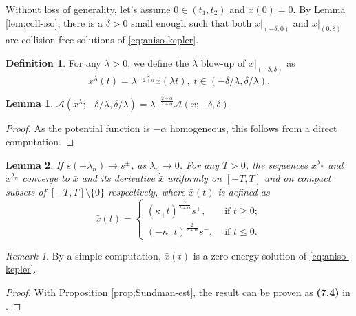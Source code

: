 \documentclass[11pt]{amsart}
\newcommand{\A}{\mathcal A}
\newcommand{\al}{\alpha}
\newcommand{\dl}{\delta}
\newcommand{\lmd}{\lambda}
\newcommand{\kp}{\kappa}
\theoremstyle{plain}
\newtheorem{lem}{Lemma}[section]
\theoremstyle{definition}
\newtheorem{dfn}{Definition}[section]
\theoremstyle{remark}
\newtheorem{rem}{Remark}[section]
\begin{document}
Without loss of generality, let's assume $0 \in (t_1, t_2)$ and $x(0)=0$. By Lemma \ref{lem;coll-iso}, there is a $\dl>0$ small enough such that both $x|_{(-\dl, 0)}$ and $x|_{(0, \dl)}$ are collision-free solutions of \eqref{eq;aniso-kepler}.  

 
\begin{dfn}
\label{dfn;blow-up} For any $\lmd>0$, we define the $\lmd$ blow-up of $x|_{(-\dl, \dl)}$ as 
$$ x^{\lmd}(t) = \lmd^{-\frac{2}{2+\al}} x(\lmd t), \; t \in (-\dl/\lmd, \dl/\lmd). $$
\end{dfn}


\begin{lem}
\label{lem;action-homo} $\A(x^{\lmd}; -\dl/\lmd, \dl/\lmd) = \lmd^{-\frac{2-\al}{2+\al}} \A(x; -\dl, \dl)$. 
\end{lem}

\begin{proof}
	As the potential function is $-\al$ homogeneous, this follows from a direct computation.
\end{proof}

\begin{lem}
\label{lem;blow-up} If $s(\pm \lmd_n) \to s^{\pm}$, as $\lmd_n \to 0$. For any $T>0$, the sequences $x^{\lmd_n}$ and $\dot{x}^{\lmd_n}$ converge to $\bar{x}$ and its derivative $\dot{\bar{x}}$ uniformly on $[-T, T]$ and on compact subsets of $[-T, T] \setminus \{0\}$ respectively, where $\bar{x}(t)$ is defined as
\begin{equation}
\label{eq;xbar} \bar{x}(t) = \begin{cases}
(\kp_+ t)^{\frac{2}{2 +\al}} s^+, & \text{ if } t \ge 0; \\
(-\kp_- t)^{\frac{2}{2 +\al}} s^-, & \text{ if } t \le 0.
\end{cases}
\end{equation}
\end{lem}

\begin{rem}
By a simple computation, $\bar{x}(t)$ is a zero energy solution of \eqref{eq;aniso-kepler}. 
\end{rem}

\begin{proof}
	With Proposition \ref{prop;Sundman-est}, the result can be proven as \textbf{(7.4)} in \cite{FT04}. 
\end{proof}
\end{document}
